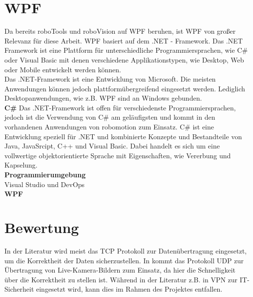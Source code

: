 \documentclass[ a4paper,
                oneside,
                toc=bibliography,
                toc=listof
                ]{scrbook}
\begin{document}
   	\section{WPF}
   	Da bereits roboTools und roboVision auf WPF beruhen, ist WPF von großer Relevanz für diese Arbeit. WPF basiert auf dem .NET - Framework.
   	Das .NET Framework ist eine Plattform für unterschiedliche Programmiersprachen, wie C\# oder Visual Basic  mit denen verschiedene Applikationstypen, wie Desktop, Web oder Mobile entwickelt werden können.\\
   	Das .NET-Framework ist eine Entwicklung von Microsoft. Die meisten Anwendungen können jedoch plattformübergreifend eingesetzt werden. Lediglich Desktopanwendungen, wie z.B. WPF sind an Windows gebunden.\\
   	\textbf{C\#}
   	Das .NET-Framework ist offen für verschiedenste Programmiersprachen, jedoch ist die Verwendung von C\# am geläufigsten und kommt in den vorhandenen Anwendungen von robomotion zum Einsatz. C\# ist eine Entwicklung speziell für .NET und kombinierte Konzepte und Bestandteile von Java, JavaSrcipt, C++ und Visual Basic. Dabei handelt es sich um eine vollwertige objektorientierte Sprache mit Eigenschaften, wie Vererbung und Kapselung.\\
   	\textbf{Programmierumgebung}\\
   	Visual Studio und DevOps\\
   	\textbf{WPF}
   
   	
   	\section{Bewertung}
   	In der Literatur wird meist das TCP Protokoll zur Datenübertragung eingesetzt, um die Korrektheit der Daten sicherzustellen. In \cite{groza2008using} kommt das Protokoll UDP zur Übertragung von Live-Kamera-Bildern zum Einsatz, da hier die Schnelligkeit über die Korrektheit zu stellen ist. Während in der Literatur z.B. in \cite{groza2008using} VPN zur IT-Sicherheit eingesetzt wird, kann dies im Rahmen des Projektes entfallen.
   	
	\newpage
	
\end{document}
